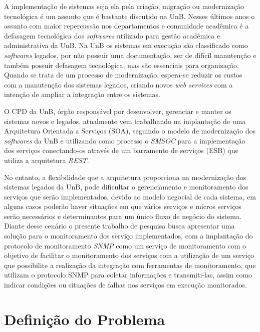 \label{Introducao}

A implementação de sistemas seja ela pela criação, migração ou modernização tecnológica é um assunto que é bastante discutido na \acrfull{UnB}. Nesses últimos anos o assunto com maior repercussão nos departamentos e comunidade acadêmica é a defasagem tecnológica dos \textit{softwares} utilizado para gestão acadêmica e administrativa da \acrshort{UnB}. Na \acrshort{UnB} os sistemas em execução são classificado como \textit{softwares} legados, por não possuir uma documentação, ser de difícil manutenção e também possuir defasagem tecnológica, mas são essenciais para organização. Quando se trata de um processo de modernização, espera-se reduzir os custos com a manutenção dos sistemas legados, criando novos \textit{web services} com a intenção de ampliar a integração entre os sistemas\cite{Agilar}.

O \acrfull{CPD} da \acrshort{UnB}, órgão responsável por desenvolver, gerenciar e manter os sistemas novos e legados, atualmente vem trabalhando na implantação de uma Arquitetura Orientada a Serviços (\acrshort{SOA}), seguindo o modelo de modernização dos \textit{softwares} da \acrshort{UnB} e utilizando como processo o \textit{\acrfull{SMSOC}} para a implementação dos serviços conectando-os  através de um barramento de serviços (\acrshort{ESB}) que utiliza a arquitetura \textit{\acrfull{REST}}.

No entanto, a flexibilidade que a arquitetura proporciona na modernização dos sistemas legados da \acrshort{UnB}, pode dificultar o gerenciamento e monitoramento dos serviços que serão implementados, devido ao modelo negocial de cada sistema, em alguns casos poderão haver situações em que vários serviços e micros serviços serão necessários e determinantes para um único fluxo de negócio do sistema. Diante desse cenário o presente trabalho de pesquisa busca apresentar uma solução para o monitoramento dos serviço implementados, com a implantação do protocolo de monitoramento \textit{\acrfull{SNMP}} como um serviço de monitoramento com o objetivo de facilitar o monitoramento dos serviços com a utilização de um serviço que possibilite a realização da integração com ferramentas de monitoramento, que utilizam o protocolo \acrshort{SNMP} para coletar informações e transmiti-las, assim como indicar condições ou situações de falhas nos serviços em execução monitorados.


\section{Definição do Problema}

